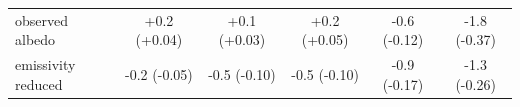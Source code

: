 \begin{table}[!tbp]
\begin{tabular}{@{}lccccc@{}}
observed albedo & +0.2 (+0.04) & +0.1 (+0.03) & +0.2 (+0.05) & -0.6 (-0.12) & -1.8 (-0.37) \\
emissivity reduced & -0.2 (-0.05) & -0.5 (-0.10) & -0.5 (-0.10) & -0.9 (-0.17) & -1.3 (-0.26) \\
\bottomrule
\end{tabular}
\endgroup
\par{}
\end{table}
